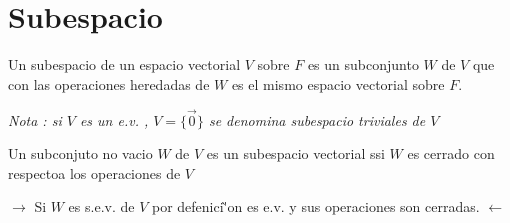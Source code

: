 \newpage
\section{Subespacio}
\begin{definicion}	
Un subespacio de un espacio vectorial $V$ sobre $F$ es un subconjunto $W$ de $V$ que con las operaciones heredadas de $W$ es el mismo espacio vectorial sobre $F$.
		
	\end{definicion}	
\emph{Nota : si $V$ es un e.v. , $V=\{ \vec{0} \}$ se denomina subespacio triviales de $V$} 

\begin{proposicion}
 	Un subconjuto no vacio $W$ de $V$ es un subespacio vectorial ssi $W$ es cerrado con respectoa los operaciones de $V$
 \end{proposicion} 

 $\rightarrow$ Si $W$ es s.e.v. de $V$ por defenici\`'on es e.v. y sus operaciones son cerradas.
 $\leftarrow$ 

 